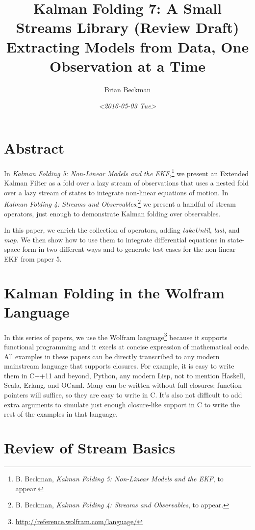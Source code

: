 \documentclass[10pt,oneside,x11names]{article}
\author{Brian Beckman}
\date{\textit{<2016-05-03 Tue>}}
\title{Kalman Folding 7: A Small Streams Library (Review Draft)\\\medskip
\large Extracting Models from Data, One Observation at a Time}
\begin{document}
\maketitle
\setcounter{tocdepth}{2}
\tableofcontents


\section{Abstract}
\label{sec:orgheadline1}

In \emph{Kalman Folding 5: Non-Linear Models and the EKF},\footnote{B. Beckman, \emph{Kalman Folding 5: Non-Linear Models and the EKF}, to appear.} we present an
Extended Kalman Filter as a fold over a lazy stream of observations that uses a
nested fold over a lazy stream of states to integrate non-linear equations of
motion. In \emph{Kalman Folding 4: Streams and Observables},\footnote{B. Beckman, \emph{Kalman Folding 4: Streams and Observables}, to appear.} we present a
handful of stream operators, just enough to demonstrate Kalman folding over
observables.

In this paper, we enrich the collection of operators, adding \emph{takeUntil},
\emph{last}, and \emph{map}. We then show how to use them to integrate differential
equations in state-space form in two different ways and to generate test cases
for the non-linear EKF from paper 5.

\section{Kalman Folding in the Wolfram Language}
\label{sec:orgheadline2}

In this series of papers, we use the Wolfram language\footnote{\url{http://reference.wolfram.com/language/}} because it
supports functional programming and it excels
at concise expression of mathematical code. All examples in these papers can be
directly transcribed to any modern mainstream language that supports closures.
For example, it is easy to write them in C++11 and beyond, Python, any modern
Lisp, not to mention Haskell, Scala, Erlang, and OCaml. Many can be written
without full closures; function pointers will suffice, so they are easy to write
in C. It's also not difficult to add extra arguments to simulate just enough
closure-like support in C to write the rest of the examples in that language.

\section{Review of Stream Basics}
\label{sec:orgheadline3}
\end{document}
